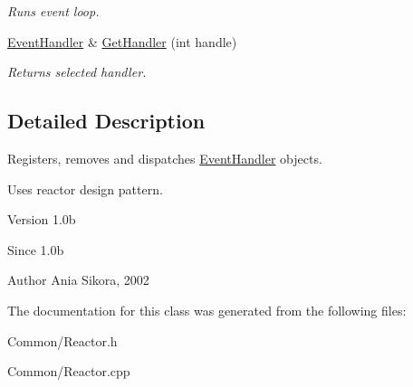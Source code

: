 \begin{DoxyCompactItemize}
\begin{DoxyCompactList}\small\item\em Runs event loop. \end{DoxyCompactList}\item 
\hypertarget{class_common_1_1_reactor_a086f50bf8357cf8921ae2b9f2a4ce15e}{\hyperlink{class_common_1_1_event_handler}{Event\-Handler} \& \hyperlink{class_common_1_1_reactor_a086f50bf8357cf8921ae2b9f2a4ce15e}{Get\-Handler} (int handle)}\label{class_common_1_1_reactor_a086f50bf8357cf8921ae2b9f2a4ce15e}

\begin{DoxyCompactList}\small\item\em Returns selected handler. \end{DoxyCompactList}\end{DoxyCompactItemize}


\subsection{Detailed Description}
Registers, removes and dispatches \hyperlink{class_common_1_1_event_handler}{Event\-Handler} objects. 

Uses reactor design pattern.

\begin{DoxyVersion}{Version}
1.\-0b 
\end{DoxyVersion}
\begin{DoxySince}{Since}
1.\-0b 
\end{DoxySince}
\begin{DoxyAuthor}{Author}
Ania Sikora, 2002 
\end{DoxyAuthor}


The documentation for this class was generated from the following files\-:\begin{DoxyCompactItemize}
\item 
Common/Reactor.\-h\item 
Common/Reactor.\-cpp\end{DoxyCompactItemize}
